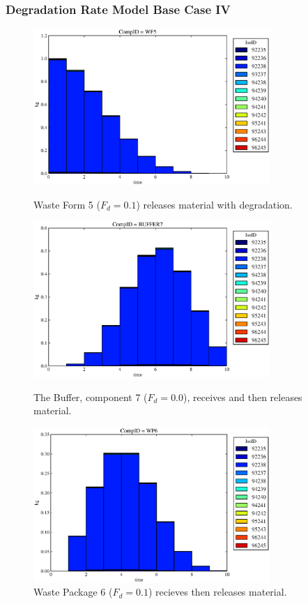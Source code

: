 \begin{frame}
  \frametitle{Degradation Rate Model Base Case IV}
  \begin{figure}
\begin{minipage}[b]{0.45\linewidth}

  \includegraphics[width=0.8\textwidth]{./images/drIV1.eps}
  \caption[DRIII Waste Form Contaminants.]{
    Waste Form 5 ($F_d = 0.1$) releases material with degradation. 
    }
  \label{fig:drIVwf5}
  
  \includegraphics[width=0.8\textwidth]{./images/drIV3.eps}
  \caption[Case DRIII Buffer Contaminants]{
    The Buffer, component 7 ($F_d=0.0$), receives and then releases material.
    }
  \label{fig:drIVbuff}

\end{minipage}
\hspace{0.05\linewidth}
\begin{minipage}[b]{0.45\linewidth}
  \includegraphics[width=0.8\textwidth]{./images/drIV2.eps}
  \caption[Case DRIII Waste Package Contaminants.]{ 
    Waste Package 6 ($F_d = 0.1$) recieves then releases material. 
    }
  \label{fig:drIVwp6}


\end{minipage}
\end{figure}
\end{frame}
